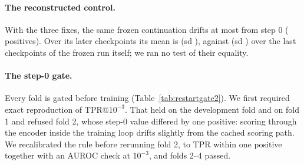 \paragraph{The reconstructed control.} With the three fixes, the same frozen continuation
drifts at most \restartFixedMaxDrift{} from step 0 (\restartFixedMaxDriftPos{} positives). Over
its \restartFixedN{} later checkpoints its mean is \restartFixedMean{} (sd \restartFixedSD{}),
against \restartTailMean{} (sd \restartTailSD{}) over the last \restartTailN{} checkpoints of
the frozen run itself; we ran no test of their equality.

\paragraph{The step-0 gate.} Every fold is gated before training (Table~\ref{tab:restartgate2}).
We first required exact reproduction of TPR@$10^{-3}$. That held on the development fold and on
fold 1 and refused fold 2, whose step-0 value differed by one positive: scoring through the
encoder inside the training loop drifts slightly from the cached scoring path. We recalibrated
the rule before rerunning fold 2, to TPR within one positive together with an AUROC check at
$10^{-3}$, and folds 2--4 passed.


